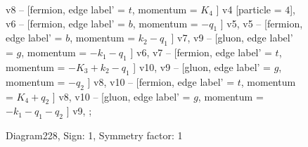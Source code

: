 \documentclass{revtex4}
\begin{document}
\begin{figure}[!htb]
\begin{center}
{v8 -- [fermion, edge label' = \(t\), momentum = \(K_{4}\) ] v4 [particle = \(4\)], 
v6 -- [fermion, edge label' = \(b\), momentum = \(-q_{1}\) ] v5, 
v5 -- [fermion, edge label' = \(b\), momentum = \(k_{2} - q_{1}\) ] v7, 
v9 -- [gluon, edge label' = \(g\), momentum = \(-k_{1} - q_{1}\) ] v6, 
v7 -- [fermion, edge label' = \(t\), momentum = \(-K_{3} + k_{2} - q_{1}\) ] v10, 
v9 -- [gluon, edge label' = \(g\), momentum = \(-q_{2}\) ] v8, 
v10 -- [fermion, edge label' = \(t\), momentum = \(K_{4} + q_{2}\) ] v8, 
v10 -- [gluon, edge label' = \(g\), momentum = \(-k_{1} - q_{1} - q_{2}\) ] v9, 
};
\end{center}
\caption{Diagram228, Sign: 1, Symmetry factor: 1}
\end{figure}
\newpage
\end{document}
